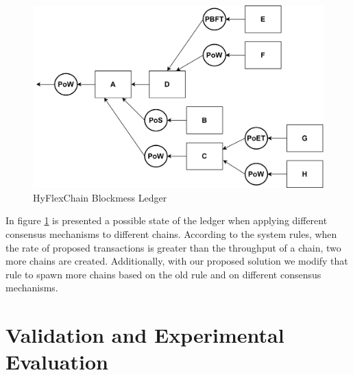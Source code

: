 \begin{figure}[h]
    \centering
    \includegraphics[scale=0.5]{Chapters/Figures/drawio/hyflexchain/blockmess/hyflexchain_blockmess_pluggabble_consensus_chain.png}
    \caption{HyFlexChain Blockmess Ledger}
    \label{fig:hyflexchain_ledger_blockmess}
\end{figure}

In figure \ref{fig:hyflexchain_ledger_blockmess} is presented a possible state of the ledger when applying different consensus mechanisms to different chains. According to the system rules, when the rate of proposed transactions is greater than the throughput of a chain, two more chains are created. Additionally, with our proposed solution we modify that rule to spawn more chains based on the old rule and on different consensus mechanisms. %





\section{Validation and Experimental Evaluation}
\label{sec:experimental-eval}

